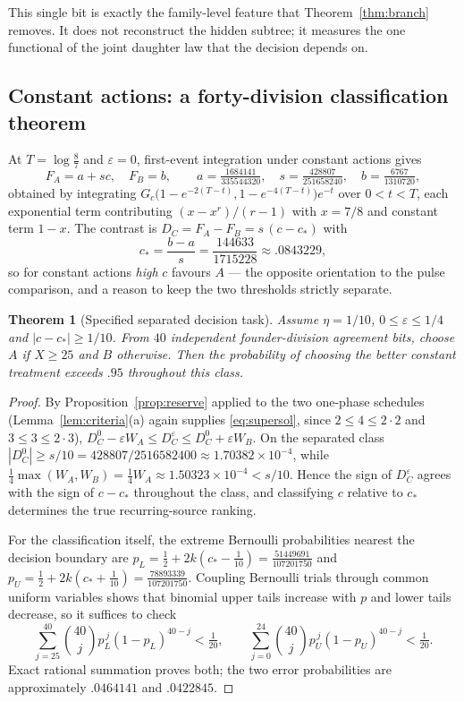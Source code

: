 \documentclass[11pt]{article}
\theoremstyle{plain}
\newtheorem{theorem}{Theorem}
\theoremstyle{definition}
\theoremstyle{remark}
\newcommand{\eps}{\varepsilon}
\begin{document}
This single bit is exactly the family-level feature that
Theorem~\ref{thm:branch} removes. It does not reconstruct the hidden subtree;
it measures the one functional of the joint daughter law that the decision
depends on.

\subsection{Constant actions: a forty-division classification theorem}

At $T=\log\frac87$ and $\eps=0$, first-event integration under constant actions
gives
\begin{equation}\label{eq:constant}
 F_A=a+sc,\quad F_B=b,\qquad
 a=\tfrac{1684141}{335544320},\quad
 s=\tfrac{428807}{251658240},\quad
 b=\tfrac{6767}{1310720},
\end{equation}
obtained by integrating $G_c\bigl(1-e^{-2(T-t)},1-e^{-4(T-t)}\bigr)e^{-t}$ over
$0<t<T$, each exponential term contributing $(x-x^r)/(r-1)$ with $x=7/8$ and
constant term $1-x$. The contrast is $D_C=F_A-F_B=s\,(c-c_*)$ with
\begin{equation}\label{eq:cstar}
 c_*=\frac{b-a}{s}=\frac{144633}{1715228}\approx.0843229 ,
\end{equation}
so for constant actions \emph{high} $c$ favours $A$ --- the opposite
orientation to the pulse comparison, and a reason to keep the two thresholds
strictly separate.

\begin{theorem}[Specified separated decision task]\label{thm:forty}
Assume $\eta=1/10$, $0\le\eps\le1/4$ and $|c-c_*|\ge1/10$. From $40$
independent founder-division agreement bits, choose $A$ if $X\ge25$ and $B$
otherwise. Then the probability of choosing the better constant treatment
exceeds $.95$ throughout this class.
\end{theorem}

\begin{proof}
By Proposition~\ref{prop:reserve} applied to the two one-phase schedules
(Lemma~\ref{lem:criteria}(a) again supplies \eqref{eq:supersol}, since
$2\le4\le2\cdot2$ and $3\le3\le2\cdot3$),
$D_C^0-\eps W_A\le D_C^{\eps}\le D_C^0+\eps W_B$. On the separated class
$|D_C^0|\ge s/10=428807/2516582400\approx1.70382\times10^{-4}$, while
$\tfrac14\max(W_A,W_B)=\tfrac14W_A\approx1.50323\times10^{-4}<s/10$. Hence the
sign of $D_C^{\eps}$ agrees with the sign of $c-c_*$ throughout the class, and
classifying $c$ relative to $c_*$ determines the true recurring-source ranking.

For the classification itself, the extreme Bernoulli probabilities nearest the
decision boundary are
$p_L=\tfrac12+2k(c_*-\tfrac1{10})=\tfrac{51449691}{107201750}$ and
$p_U=\tfrac12+2k(c_*+\tfrac1{10})=\tfrac{78893339}{107201750}$. Coupling
Bernoulli trials through common uniform variables shows that binomial upper
tails increase with $p$ and lower tails decrease, so it suffices to check
\[
 \sum_{j=25}^{40}\binom{40}{j}p_L^{\,j}(1-p_L)^{40-j}<\tfrac1{20},
 \qquad
 \sum_{j=0}^{24}\binom{40}{j}p_U^{\,j}(1-p_U)^{40-j}<\tfrac1{20}.
\]
Exact rational summation proves both; the two error probabilities are
approximately $.0464141$ and $.0422845$.
\end{proof}
\end{document}
